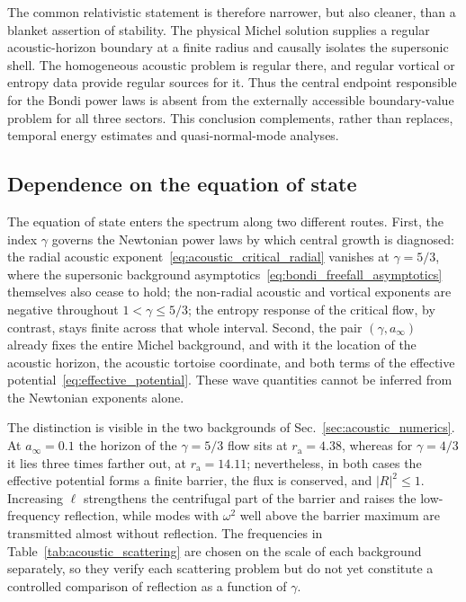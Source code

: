 \documentclass[12pt,a4paper,preprint,nopreprintline]{elsarticle}
\begin{document}
The common relativistic statement is therefore narrower, but also cleaner, than a blanket assertion of stability. The physical Michel solution supplies a regular acoustic-horizon boundary at a finite radius and causally isolates the supersonic shell. The homogeneous acoustic problem is regular there, and regular vortical or entropy data provide regular sources for it. Thus the central endpoint responsible for the Bondi power laws is absent from the externally accessible boundary-value problem for all three sectors. This conclusion complements, rather than replaces, temporal energy estimates and quasi-normal-mode analyses.

\subsection{Dependence on the equation of state}
\label{sec:parameter_dependence}

The equation of state enters the spectrum along two different routes. First, the index $\gamma$ governs the Newtonian power laws by which central growth is diagnosed: the radial acoustic exponent~\eqref{eq:acoustic_critical_radial} vanishes at $\gamma=5/3$, where the supersonic background asymptotics~\eqref{eq:bondi_freefall_asymptotics} themselves also cease to hold; the non-radial acoustic and vortical exponents are negative throughout $1<\gamma\leq5/3$; the entropy response of the critical flow, by contrast, stays finite across that whole interval. Second, the pair $(\gamma,a_{\infty})$ already fixes the entire Michel background, and with it the location of the acoustic horizon, the acoustic tortoise coordinate, and both terms of the effective potential~\eqref{eq:effective_potential}. These wave quantities cannot be inferred from the Newtonian exponents alone.

The distinction is visible in the two backgrounds of Sec.~\ref{sec:acoustic_numerics}. At $a_{\infty}=0.1$ the horizon of the $\gamma=5/3$ flow sits at $r_{\mathrm{a}}=4.38$, whereas for $\gamma=4/3$ it lies three times farther out, at $r_{\mathrm{a}}=14.11$; nevertheless, in both cases the effective potential forms a finite barrier, the flux is conserved, and $|R|^{2}\leq1$. Increasing $\ell$ strengthens the centrifugal part of the barrier and raises the low-frequency reflection, while modes with $\omega^{2}$ well above the barrier maximum are transmitted almost without reflection. The frequencies in Table~\ref{tab:acoustic_scattering} are chosen on the scale of each background separately, so they verify each scattering problem but do not yet constitute a controlled comparison of reflection as a function of $\gamma$.
\end{document}
